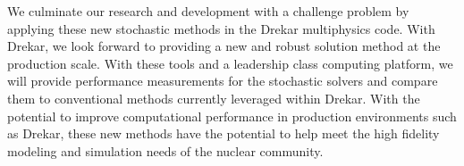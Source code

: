 We culminate our research and development with a challenge problem by
applying these new stochastic methods in the Drekar multiphysics
code. With Drekar, we look forward to providing a new and robust
solution method at the production scale. With these tools and a
leadership class computing platform, we will provide performance
measurements for the stochastic solvers and compare them to
conventional methods currently leveraged within Drekar. With the
potential to improve computational performance in production
environments such as Drekar, these new methods have the potential to
help meet the high fidelity modeling and simulation needs of the
nuclear community.
